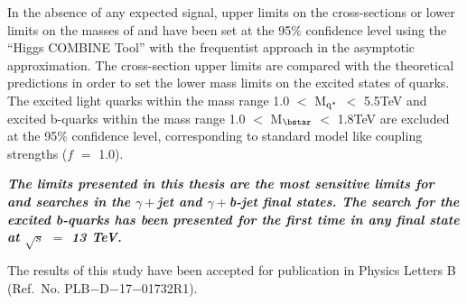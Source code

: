 In the absence of any expected signal, upper limits on the cross-sections or lower limits on the masses of \qstar and \bstar have been set at the 95$\%$ confidence level
using the ``Higgs COMBINE Tool'' with the frequentist approach in the asymptotic approximation. The cross-section upper limits are compared with the
theoretical predictions in order to set the lower mass limits on the excited states of quarks. The excited light quarks within the mass range
1.0 $<$ M$_{\mathrm{q^\star}}$ $<$ 5.5\unit{TeV} and excited b-quarks within the mass range 1.0 $<$ M$_{\bstar}$ $<$ 1.8\unit{TeV} are excluded at the 95$\%$ confidence level,
corresponding to standard model like coupling strengths ($f$ $=$ 1.0).

\textit{\textbf{The limits presented in this thesis are the most
  sensitive limits for \qstar and \bstar searches in the ${\gamma}+$jet and ${\gamma}+$b-jet final states.
  The search for the excited b-quarks has been presented for the first time
  in any final state at $\sqrt{s}$ $=$ 13 TeV.}}

The results of this study have been accepted for publication in Physics Letters B (Ref.\ No.\: PLB$-$D$-$17$-$01732R1). 



